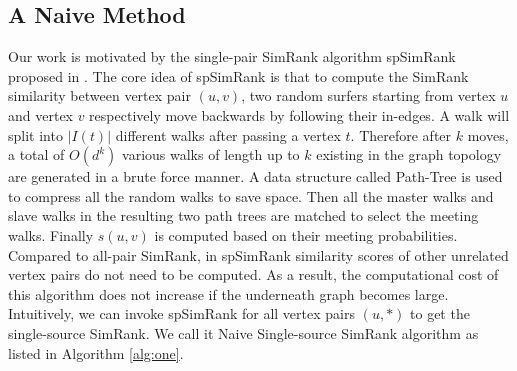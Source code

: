 \documentclass[conference]{IEEEtran}
\theoremstyle{definition}
\theoremstyle{definition}
\begin{document}
\subsection{A Naive Method}
\iffalse
In \cite{jeh2002simrank} and its optimizations \cite{lizorkin2008accuracy}\cite{fogaras2005scaling}, similarities are computed according to Eq. (\ref{eq:two}). 
That means to obtain similarity of $(u, v)$, similarities of $(w, t)$ should be computed beforehand for any $w \in I(u)$ and $t \in I(v)$.
Obviously for single-source SimRank problems, computation of all-pair similarities is unnecessary. 
\fi
 Our work is motivated by the single-pair SimRank algorithm spSimRank proposed in \cite{li2010fast}. 
 The core idea of  spSimRank is that to compute the SimRank similarity between vertex pair $(u, v)$, two random surfers starting from vertex $u$ and vertex $v$ respectively move backwards by following their in-edges.
A walk will split into $|I(t)|$ different walks after passing a vertex $t$.
Therefore after $k$ moves, a total of $O(d^k)$ various walks of length up to $k$ existing in the graph topology are generated in a brute force manner. 
A data structure called Path-Tree is used to compress all the random walks to save space. 
Then all the master walks and slave walks in the resulting two path trees are matched to select the meeting walks.
 Finally $s(u,v)$ is  computed  based on their meeting probabilities. 
Compared to all-pair SimRank, in  spSimRank similarity scores of other unrelated vertex pairs do not need to be computed.
As a result, the computational cost of this algorithm does not increase if the underneath graph becomes large. 
Intuitively,  we can invoke spSimRank for all vertex pairs $(u, *)$ to get the single-source SimRank.
We call it Naive Single-source SimRank algorithm as listed in Algorithm \ref{alg:one}.
\end{document}
